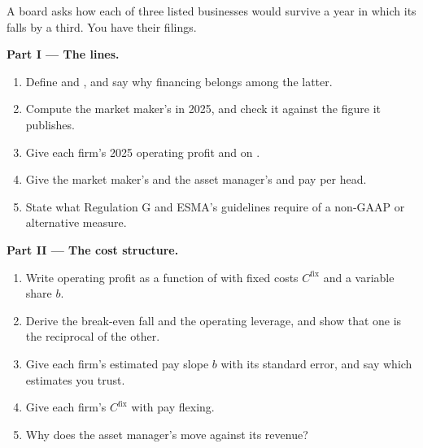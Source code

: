 \begin{problem}\label{pb:fm:the-economics-of-a-trading-firm:1}
A board asks how each of three listed businesses would survive a year in which its  falls by a third. You have their filings.

\medskip\noindent\textbf{Part I --- The lines.}
\begin{enumerate}
\item Define  and , and say why financing belongs among the latter.
\item Compute the market maker's  in 2025, and check it against the figure it publishes.
\item Give each firm's 2025 operating profit and  on .
\item Give the market maker's and the asset manager's  and pay per head.
\item State what Regulation G and ESMA's guidelines require of a non-GAAP or alternative measure.
\end{enumerate}

\medskip\noindent\textbf{Part II --- The cost structure.}
\begin{enumerate}[resume]
\item Write operating profit as a function of  with fixed costs $C^{\mathrm{fix}}$ and a variable share $b$.
\item Derive the break-even fall and the operating leverage, and show that one is the reciprocal of the other.
\item Give each firm's estimated pay slope $b$ with its standard error, and say which estimates you trust.
\item Give each firm's $C^{\mathrm{fix}}$ with pay flexing.
\item Why does the asset manager's  move against its revenue?
\end{enumerate}


\end{problem}
